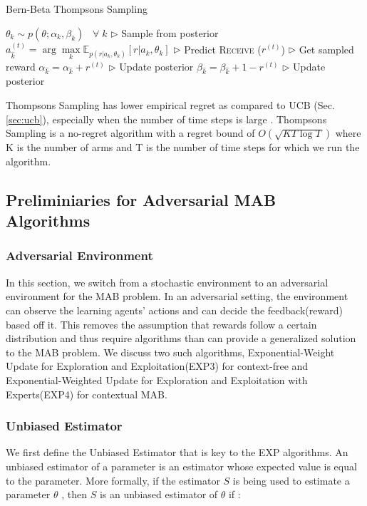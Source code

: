 \documentclass[11pt]{article}
\begin{document}
\begin{algorithm}[H]
\caption{Bern-Beta Thompsons Sampling}
\label{algo:thompeff}
\begin{algorithmic}[1]
\STATE $\theta_{k} \sim p(\theta; \alpha_k, \beta_k) \;\;\; \forall \; k$ \hfill $\triangleright$ Sample from posterior
\STATE $a_{\hat{k}}^{(t)} = \arg\max\limits_k \mathbb{E}_{p(r|a_k, \theta_k)}[r|a_k, \theta_k] $ \hfill $\triangleright$ Predict
\STATE \textsc{Receive} ($r^{(t)}$) \hfill $\triangleright$ Get sampled reward
\STATE $\alpha_{\hat{k}} = \alpha_{\hat{k}} + r^{(t)}$ \hfill $\triangleright$ Update posterior
\STATE $\beta_{\hat{k}} = \beta_{\hat{k}} + 1 - r^{(t)}$ \hfill $\triangleright$ Update posterior

\ENDFOR
\end{algorithmic}
\end{algorithm}

Thompsons Sampling has lower empirical regret as compared to UCB (Sec. \ref{sec:ucb}), especially when the number of time steps is large \cite{NIPS2011_e53a0a29}. Thompsons Sampling is a no-regret algorithm with a regret bound of $O(\sqrt{KT\log T})$ where K is the number of arms and T is the number of time steps for which we run the algorithm.

\subsection{Preliminiaries for Adversarial MAB Algorithms}

\subsubsection{Adversarial Environment}
In this section, we switch from a stochastic environment to an adversarial environment for the MAB problem. In an adversarial setting, the environment can observe the learning agents' actions and can decide the feedback(reward) based off it. This removes the assumption that rewards follow a certain distribution and thus require algorithms than can provide a generalized solution to the MAB problem. We discuss two such algorithms, Exponential-Weight Update for Exploration and Exploitation(EXP3) for context-free and Exponential-Weighted Update for Exploration and Exploitation with Experts(EXP4) for contextual MAB. 

\subsubsection{Unbiased Estimator}
We first define the Unbiased Estimator that is key to the EXP algorithms. An unbiased estimator of a parameter is an estimator whose expected value is equal to the parameter\cite{unb_est}. More formally, if the estimator $S$  is being used to estimate a parameter  $\theta$ , then  $S$ is an unbiased estimator of $\theta$ if :
\end{document}
